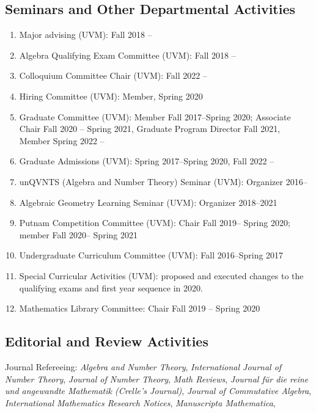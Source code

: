 \documentclass[a4paper,10pt]{article}
\begin{document}
\subsection*{Seminars and Other Departmental Activities}

\begin{enumerate}
	\item Major advising (UVM): Fall 2018 --
	\item Algebra Qualifying Exam Committee (UVM): Fall 2018 --
	\item Colloquium Committee Chair (UVM): Fall 2022 --
	\item Hiring Committee (UVM): Member, Spring 2020
	\item Graduate Committee (UVM): Member Fall 2017--Spring 2020; Associate Chair Fall 2020 -- Spring 2021, Graduate Program Director Fall 2021, Member Spring 2022 -- 
	\item Graduate Admissions (UVM): Spring 2017--Spring 2020, Fall 2022 --
	\item unQVNTS (Algebra and Number Theory) Seminar (UVM): Organizer 2016--
	\item Algebraic Geometry Learning Seminar (UVM): Organizer 2018--2021
	\item Putnam Competition Committee (UVM): Chair Fall 2019-- Spring 2020; member Fall 2020-- Spring 2021
	\item Undergraduate Curriculum Committee (UVM): Fall 2016--Spring 2017 
	\item Special Curricular Activities (UVM): proposed and executed changes to the qualifying exams and first year sequence in 2020. 
	\item Mathematics Library Committee:  Chair Fall 2019 -- Spring 2020
\end{enumerate}

\subsection*{Editorial and Review Activities}
Journal Refereeing: \emph{Algebra and Number Theory}, \emph{International Journal of Number Theory}, \emph{Journal of Number Theory}, \emph{Math Reviews}, \emph{Journal für die reine und angewandte Mathematik (Crelle’s Journal)}, \emph{Journal of Commutative Algebra}, \emph{International Mathematics Research Notices}, \emph{Manuscripta Mathematica}, \emph{}
\end{document}
